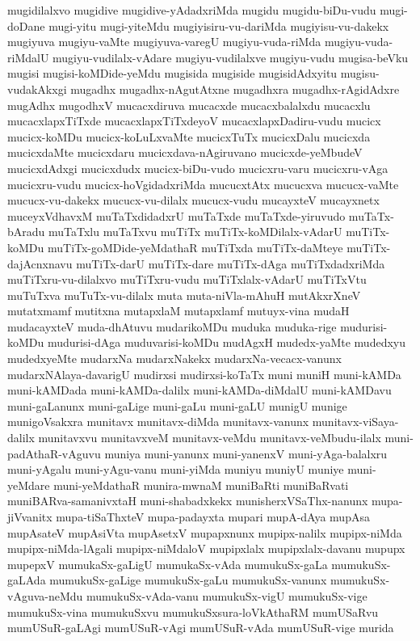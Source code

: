 {mugidilalxvo
mugidive
mugidive-yAdadxriMda
mugidu
mugidu-biDu-vudu
mugi-doDane
mugi-yitu
mugi-yiteMdu
mugiyisiru-vu-dariMda
mugiyisu-vu-dakekx
mugiyuva
mugiyu-vaMte
mugiyuva-varegU
mugiyu-vuda-riMda
mugiyu-vuda-riMdalU
mugiyu-vudilalx-vAdare
mugiyu-vudilalxve
mugiyu-vudu
mugisa-beVku
mugisi
mugisi-koMDide-yeMdu
mugisida
mugiside
mugisidAdxyitu
mugisu-vudakAkxgi
mugadhx
mugadhx-nAgutAtxne
mugadhxra
mugadhx-rAgidAdxre
mugAdhx
mugodhxV
mucacxdiruva
mucacxde
mucacxbalalxdu
mucacxlu
mucacxlapxTiTxde
mucacxlapxTiTxdeyoV
mucacxlapxDadiru-vudu
mucicx
mucicx-koMDu
mucicx-koLuLxvaMte
mucicxTuTx
mucicxDalu
mucicxda
mucicxdaMte
mucicxdaru
mucicxdava-nAgiruvano
mucicxde-yeMbudeV
mucicxdAdxgi
mucicxdudx
mucicx-biDu-vudo
mucicxru-varu
mucicxru-vAga
mucicxru-vudu
mucicx-hoVgidadxriMda
mucucxtAtx
mucucxva
mucucx-vaMte
mucucx-vu-dakekx
mucucx-vu-dilalx
mucucx-vudu
mucayxteV
mucayxnetx
muceyxVdhavxM
muTaTxdidadxrU
muTaTxde
muTaTxde-yiruvudo
muTaTx-bAradu
muTaTxlu
muTaTxvu
muTiTx
muTiTx-koMDilalx-vAdarU
muTiTx-koMDu
muTiTx-goMDide-yeMdathaR
muTiTxda
muTiTx-daMteye
muTiTx-dajAcnxnavu
muTiTx-darU
muTiTx-dare
muTiTx-dAga
muTiTxdadxriMda
muTiTxru-vu-dilalxvo
muTiTxru-vudu
muTiTxlalx-vAdarU
muTiTxVtu
muTuTxva
muTuTx-vu-dilalx
muta
muta-niVla-mAhuH
mutAkxrXneV
mutatxmamf
mutitxna
mutapxlaM
mutapxlamf
mutuyx-vina
mudaH
mudacayxteV
muda-dhAtuvu
mudarikoMDu
muduka
muduka-rige
mudurisi-koMDu
mudurisi-dAga
muduvarisi-koMDu
mudAgxH
mudedx-yaMte
mudedxyu
mudedxyeMte
mudarxNa
mudarxNakekx
mudarxNa-vecacx-vanunx
mudarxNAlaya-davarigU
mudirxsi
mudirxsi-koTaTx
muni
muniH
muni-kAMDa
muni-kAMDada
muni-kAMDa-dalilx
muni-kAMDa-diMdalU
muni-kAMDavu
muni-gaLanunx
muni-gaLige
muni-gaLu
muni-gaLU
munigU
munige
munigoVsakxra
munitavx
munitavx-diMda
munitavx-vanunx
munitavx-viSaya-dalilx
munitavxvu
munitavxveM
munitavx-veMdu
munitavx-veMbudu-ilalx
muni-padAthaR-vAguvu
muniya
muni-yanunx
muni-yanenxV
muni-yAga-balalxru
muni-yAgalu
muni-yAgu-vanu
muni-yiMda
muniyu
muniyU
muniye
muni-yeMdare
muni-yeMdathaR
munira-mwnaM
muniBaRti
muniBaRvati
muniBARva-samanivxtaH
muni-shabadxkekx
munisherxVSaThx-nanunx
mupa-jiVvanitx
mupa-tiSaThxteV
mupa-padayxta
mupari
mupA-dAya
mupAsa
mupAsateV
mupAsiVta
mupAsetxV
mupapxnunx
mupipx-nalilx
mupipx-niMda
mupipx-niMda-lAgali
mupipx-niMdaloV
mupipxlalx
mupipxlalx-davanu
mupupx
mupepxV
mumukaSx-gaLigU
mumukaSx-vAda
mumukuSx-gaLa
mumukuSx-gaLAda
mumukuSx-gaLige
mumukuSx-gaLu
mumukuSx-vanunx
mumukuSx-vAguva-neMdu
mumukuSx-vAda-vanu
mumukuSx-vigU
mumukuSx-vige
mumukuSx-vina
mumukuSxvu
mumukuSxsura-loVkAthaRM
mumUSaRvu
mumUSuR-gaLAgi
mumUSuR-vAgi
mumUSuR-vAda
mumUSuR-vige
murida
}
